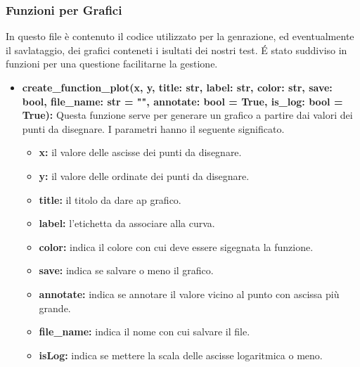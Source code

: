 \documentclass{article}
\newcommand{\newlineitem}[1]{\item \textbf{#1} \hfill \break}
\begin{document}
\subsubsection{Funzioni per Grafici}
In questo file è contenuto il codice utilizzato per la genrazione, ed eventualmente il savlataggio, dei grafici conteneti i isultati dei nostri test. \'E stato suddiviso in funzioni per una questione facilitarne la gestione.
\begin{itemize}
\newlineitem{create\_function\_plot(x, y, title: str, label: str, color: str, save: bool, file\_name: str = "", annotate: bool = True, is\_log: bool = True):}
Questa funzione serve per generare un grafico a partire dai valori dei punti da disegnare. I parametri hanno il seguente significato.
\begin{itemize}
\item \textbf{x:} il valore delle ascisse dei punti da disegnare.
\item \textbf{y:} il valore delle ordinate dei punti da disegnare.
\item \textbf{title:} il titolo da dare ap grafico.
\item \textbf{label:} l'etichetta da associare alla curva.
\item \textbf{color:} indica il colore con cui deve essere sigegnata la funzione.
\item \textbf{save:} indica se salvare o meno il grafico.
\item \textbf{annotate:} indica se annotare il valore vicino al punto con ascissa più grande.
\item \textbf{file\_name:} indica il nome con cui salvare il file.
\item \textbf{isLog:} indica se mettere la scala delle ascisse logaritmica o meno.
\end{itemize}


\end{itemize}
\end{document}
